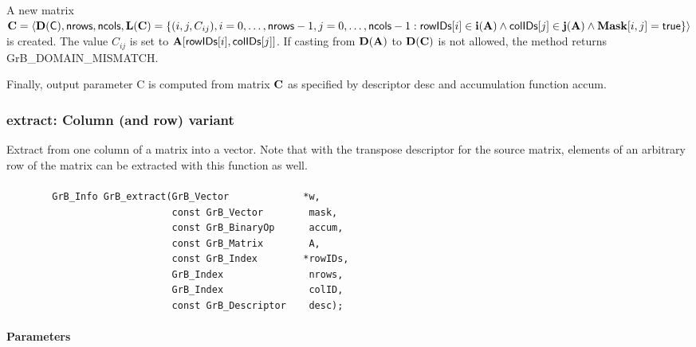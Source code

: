 A new matrix ${\bf C} = \langle \bold{D}({\sf C}),{\sf nrows},{\sf ncols},
\bold{L}({\bf C}) = \{ (i,j,C_{ij}), i = 0,\ldots,{\sf nrows}-1, j = 0, \ldots,{\sf ncols}-1 : {\sf rowIDs}[i]
\in \bold{i}({\bf A}) \wedge {\sf colIDs}[j] \in \bold{j}({\bf A}) \wedge {\bf Mask}[i,j] = {\sf true} \} \rangle$ is created. 
The value $C_{ij}$ is set to ${\bf A}[{\sf rowIDs}[i],{\sf colIDs}[j]]$. If
casting from $\bold{D}({\bf A})$ to $\bold{D}({\bf C})$ is not
allowed, the method returns {\sf GrB\_DOMAIN\_MISMATCH}.

Finally, output parameter {\sf C} is computed from matrix ${\bf C}$ as
specified by descriptor {\sf desc} and accumulation function {\sf accum}.

\subsubsection{{\sf extract}: Column (and row) variant}

Extract from one column of a matrix into a vector.  Note that with the transpose
descriptor for the source matrix, elements of an arbitrary row of the matrix
can be extracted with this function as well.

\paragraph{\syntax}

\begin{verbatim}
        GrB_Info GrB_extract(GrB_Vector             *w,
                             const GrB_Vector        mask,
                             const GrB_BinaryOp      accum,
                             const GrB_Matrix        A,
                             const GrB_Index        *rowIDs,
                             GrB_Index               nrows,
                             GrB_Index               colID,
                             const GrB_Descriptor    desc); 
\end{verbatim}

\paragraph{Parameters}

